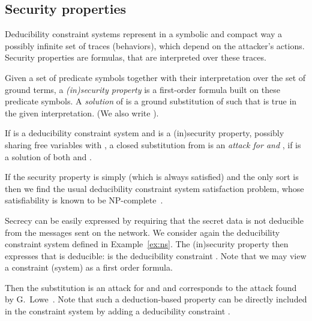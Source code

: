 \documentclass[acmtocl,acmnow]{acmtrans2m}
\newcommand{\dedcons}[1]{deducibility constraint}
\newcommand{\dedsys}[1]{deducibility constraint system}
\begin{document}
\subsection{Security properties}\label{sec:property}

Deducibility constraint systems
represent in a symbolic and compact way a
possibly infinite set of traces (behaviors), which depend on the 
attacker's actions.
Security properties are formulas, that are interpreted over these 
traces. 



\begin{definition}
Given a set of predicate symbols together with their interpretation over
the set of ground terms,
a \emph{(in)security property} is a first-order formula  built on these predicate
symbols. 
A \emph{solution} of  is a ground substitution 
of  such that  is true in the given interpretation.
(We also write ).


If  is a \dedsys{} and  is a (in)security property,
possibly sharing free variables with ,
a closed substitution  from  is an \emph{attack
for  and  }, if is a solution of both  and . 


\end{definition}



\begin{example}\label{ex:classic}
If the security property is simply  (which is always satisfied)
and the only sort is  then we find the usual
\dedsys{} satisfaction problem, whose satisfiability
 is known to be NP-complete~\cite{RT03TCS}.
\end{example}


\begin{example}\label{ex:secrecy}
Secrecy can be easily expressed by requiring that the secret data is not
deducible from the messages sent on the network.
We consider again the \dedsys{}  defined in
Example~\ref{ex:ns}.
The (in)security property then expresses that  is deducible:
 is the \dedcons{} . 
Note that we may view a constraint (system) as a first order formula.



Then the substitution 
is an attack for  and  
and corresponds to the attack found by
G.~Lowe~\cite{lowe96breaking}.
Note
that such a deduction-based property can be directly included in
the constraint system by adding a \dedcons{} .
\end{example}
\end{document}
